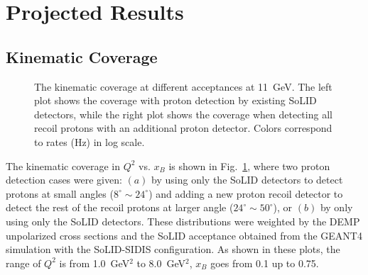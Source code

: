 \section{Projected Results}
\subsection{Kinematic Coverage}
\begin{figure}[!ht]
 \begin{center}
 \caption[The kinematic coverage at different acceptances.]{\footnotesize{The
     kinematic coverage at different acceptances at 11~GeV. The left plot
     shows the coverage with proton detection by existing SoLID
     detectors, while the right  plot
     shows the coverage when detecting all recoil protons with an additional proton detector. Colors correspond to rates (Hz) in log scale.}}
  \label{kin_cor}
  \end{center}
\end{figure}
The kinematic coverage in $Q^{2}$ vs. $x_{B}$ is shown in Fig.~\ref{kin_cor},
where two proton detection cases were given: $(a)$ by using only the SoLID
detectors to detect protons at small angles ($8^{\circ}\sim24^{\circ}$) and
adding a new proton recoil detector to detect the rest of the recoil protons at
larger angle ($24^{\circ}\sim50^{\circ}$), or $(b)$ by only using only the 
SoLID detectors. These distributions were weighted by the DEMP unpolarized
cross sections and the SoLID acceptance obtained from the GEANT4 simulation
with the SoLID-SIDIS configuration. As shown in these plots, the range of
$Q^{2}$ is from 1.0~GeV$^{2}$ to 8.0~GeV$^{2}$, $x_{B}$ goes from 0.1 up to
0.75.

